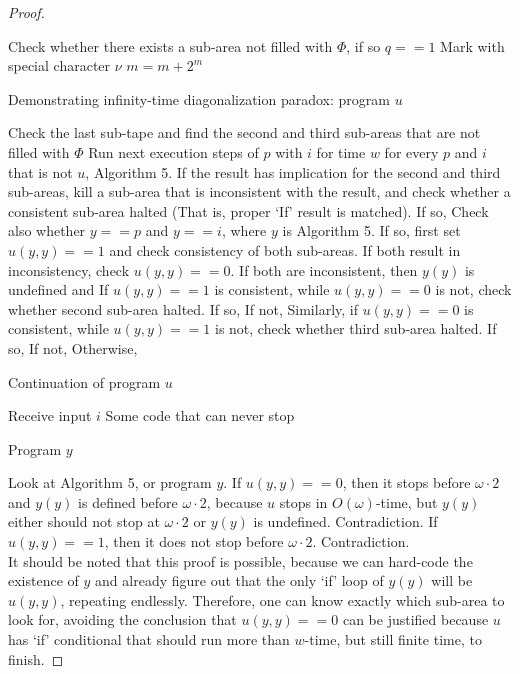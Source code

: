 \documentclass{roffin}
\begin{document}
\begin{proof}
\begin{algorithm}
{{     
 }
 Check whether there exists a sub-area not filled with $\Phi$, if so $q==1$\;
 Mark with special character $\nu$\;
 $m = m+2^m$\; 
 }
\caption{Demonstrating infinity-time diagonalization paradox: program $u$}
\end{algorithm}
\begin{algorithm}
 {
 Check the last sub-tape and find the second and third sub-areas that are not filled with $\Phi$\;
 {Run next execution steps of $p$ with $i$ for time $w$ for every $p$ and $i$ that is not $u$, Algorithm 5. If the result has implication for the second and third sub-areas, kill a sub-area that is inconsistent with the result, and check whether a consistent sub-area halted (That is, proper `If' result is matched). If so, \; Check also whether $y == p$ and $y == i$, where $y$ is Algorithm 5. If so, first set $u(y,y)==1$ and check consistency of both sub-areas. If both result in inconsistency, check $u(y,y)==0$. If both are inconsistent, then $y(y)$ is undefined and \; If $u(y,y)==1$ is consistent, while $u(y,y)==0$ is not, check whether second sub-area halted. If so, \; If not, \; Similarly, if $u(y,y)==0$ is consistent, while $u(y,y)==1$ is not, check whether third sub-area halted. If so, \; If not, \; Otherwise, \;}
 }
 \caption{Continuation of program $u$}
\end{algorithm}
\begin{algorithm}
Receive input $i$\;
{Some code that can never stop\;}
\caption{Program $y$}
\end{algorithm}
Look at Algorithm 5, or program $y$. If $u(y,y) == 0$, then it stops before $\omega \cdot 2$ and $y(y)$ is defined before $\omega \cdot 2$, because $u$ stops in $O(\omega)$-time, but $y(y)$ either should not stop at $\omega \cdot 2$ or $y(y)$ is undefined. Contradiction. If $u(y,y) == 1$, then it does not stop before $\omega \cdot 2$. Contradiction.\\
It should be noted that this proof is possible, because we can hard-code the existence of $y$ and already figure out that the only `if' loop of $y(y)$ will be $u(y,y)$, repeating endlessly. Therefore, one can know exactly which sub-area to look for, avoiding the conclusion that $u(y,y) == 0$ can be justified because $u$ has `if' conditional that should run more than $w$-time, but still finite time, to finish. 
\end{proof}
\end{document}
